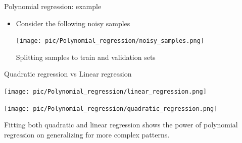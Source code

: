 \documentclass[serif, aspectratio=169]{beamer}
\begin{document}
\begin{frame}{Polynomial regression: example}
    \begin{itemize}
        \item Consider the following noisy samples
        \begin{center}
            \texttt{[image: pic/Polynomial\_regression/noisy\_samples.png]}
        \end{center}
        \vfile
        \begin{center}
            Splitting samples to train and validation sets
        \end{center}
    \end{itemize}
\end{frame}

\begin{frame}{Quadratic regression vs Linear regression}
    \begin{minipage}{0.48\textwidth}
        \centering
        \texttt{[image: pic/Polynomial\_regression/linear\_regression.png]}
    \end{minipage} %
    \begin{minipage}{0.48\textwidth}
        \centering
        \texttt{[image: pic/Polynomial\_regression/quadratic\_regression.png]}
    \end{minipage}
    \vfile
    \begin{center}
        Fitting both quadratic and linear regression shows the power of polynomial regression on generalizing for more complex patterns.
    \end{center}
\end{frame}

    
    
\end{document}
